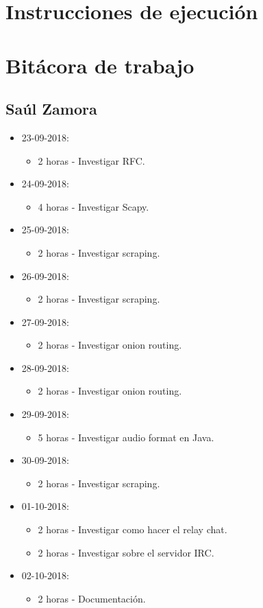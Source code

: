 \documentclass{article}
\begin{document}
\section{Instrucciones de ejecuci\'on}
\section{Bit\'acora de trabajo}
\subsection{Sa\'ul Zamora}
\begin{itemize}
  \item 23-09-2018:
  \begin{itemize}
    \item 2 horas - Investigar RFC.
  \end{itemize}
  \item 24-09-2018:
  \begin{itemize}
    \item 4 horas - Investigar Scapy.
  \end{itemize}
  \item 25-09-2018:
  \begin{itemize}
    \item 2 horas - Investigar scraping.
  \end{itemize}
  \item 26-09-2018:
  \begin{itemize}
    \item 2 horas - Investigar scraping.
  \end{itemize}
  \item 27-09-2018:
  \begin{itemize}
    \item 2 horas - Investigar onion routing.
  \end{itemize}
  \item 28-09-2018:
  \begin{itemize}
    \item 2 horas - Investigar onion routing.
  \end{itemize}
  \item 29-09-2018:
  \begin{itemize}
    \item 5 horas - Investigar audio format en Java.
  \end{itemize}
  \item 30-09-2018:
  \begin{itemize}
    \item 2 horas - Investigar scraping.
  \end{itemize}
  \item 01-10-2018:
  \begin{itemize}
    \item 2 horas - Investigar como hacer el relay chat.
    \item 2 horas - Investigar sobre el servidor IRC.
  \end{itemize}
  \item 02-10-2018:
  \begin{itemize}
    \item 2 horas - Documentaci\'on.
  \end{itemize}
\end{itemize}
\end{document}
